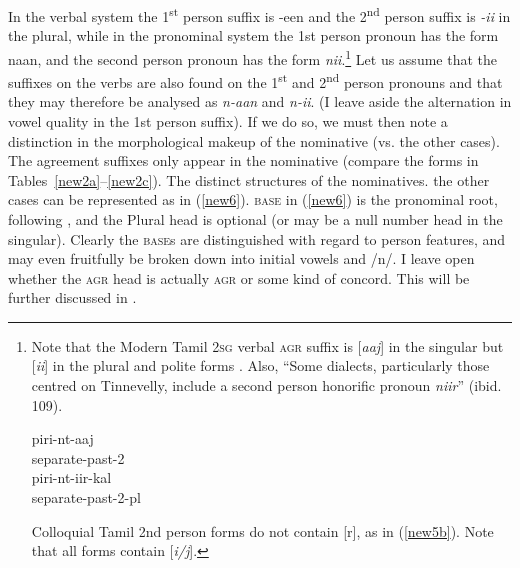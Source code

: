 \documentclass[output=paper]{langscibook}
\begin{document}
In the verbal system the 1\textsuperscript{st} person suffix is -een and the 2\textsuperscript{nd} person suffix is \textit{-ii} in the plural, while in the pronominal system the 1st person pronoun has the form naan, and the second person pronoun has the form \textit{nii}.\footnote{Note that the Modern Tamil \textsc{2sg} verbal \textsc{agr} suffix is [\textit{aaj}] in the singular but [\textit{ii}] in the plural and polite forms \citep[113]{steever2019dravidian}. Also, “Some dialects, particularly those centred on Tinnevelly, include a second person honorific pronoun \textit{niir}” (ibid. 109).


\begin{exe}
\ex \label{newfootnote1a}
\gll piri-nt-aaj \\
separate-past-2 \\

\ex \label{newfootnote1b}
\gll piri-nt-iir-kal \\ 
separate-past-2-pl \\
\end{exe}


Colloquial Tamil 2nd person forms do not contain [r], as in (\ref{new5b}). Note that all forms contain [\textit{i/j}].
}   Let us assume that the suffixes on the verbs are also found on the 1\textsuperscript{st} and 2\textsuperscript{nd} person pronouns and that they may therefore be analysed as          \textit{n-aan} and \textit{n-ii}. (I leave aside the alternation in vowel quality in the 1st person suffix). If we do so, we must then note a distinction in the morphological makeup of the nominative (vs. the other cases). The agreement suffixes only appear in the nominative (compare the forms in Tables~\ref{new2a}--\ref{new2c}). The distinct structures of the nominatives. the other cases can be represented as in (\ref{new6}). \textsc{base} in (\ref{new6}) is the pronominal root, following \citet{SmithBobaljik2019}, and the Plural head is optional (or may be a null number head in the singular). Clearly the \textsc{base}s are distinguished with regard to person features, and may even fruitfully be broken down into initial vowels and /n/. I leave open whether the \textsc{agr} head is actually \textsc{agr} or some kind of concord. This will be further discussed in .
\end{document}
